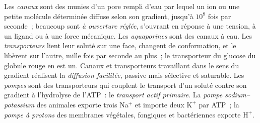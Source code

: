\begin{definition}\label{def:b1:membranes-transport:transporters}
Les \emph{canaux} sont des  munies
d'un pore rempli d'eau par lequel un ion ou une petite molécule
déterminée diffuse selon son gradient, jusqu'à $10^8$ fois par
seconde~; beaucoup sont \emph{à ouverture réglée}, s'ouvrant en réponse
à une tension, à un ligand ou à une force mécanique. Les
\emph{aquaporines} sont des canaux à eau. Les
\emph{transporteurs} lient leur soluté sur une face,
changent de conformation, et le libèrent sur l'autre, mille fois par
seconde au plus~; le transporteur du glucose du globule rouge en est un.
Canaux et transporteurs travaillant dans le sens du gradient réalisent
la \emph{diffusion facilitée}, passive mais
sélective et saturable. Les \emph{pompes} sont des
transporteurs qui couplent le transport d'un soluté contre son gradient
à l'hydrolyse de l'ATP~: le \emph{transport actif
primaire}. La \emph{pompe
sodium--potassium} des  animales
exporte trois $\mathrm{Na^+}$ et importe deux $\mathrm{K^+}$ par ATP~;
la \emph{pompe à protons} des membranes végétales, fongiques et
bactériennes exporte $\mathrm{H^+}$.
\end{definition}


